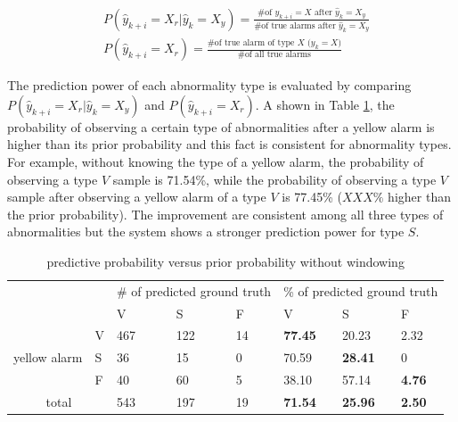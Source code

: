 \begin{align}
\nonumber 
&P(\hat{y}_{k+i}=X_r|\hat{y}_{k}=X_y)=\frac{\text{\# of $y_{k+i}=X$ after $\hat{y}_k=X_y$}}{\text{\# of true alarms after $\hat{y}_k=X_y$}} \\
&P(\hat{y}_{k+i}=X_r)=\frac{\text{\# of true alarm of type $X$ ($y_{k}=X$)}}{\text{\# of all true alarms}} 
\end{align}

The prediction power of each abnormality type is evaluated by comparing $P(\hat{y}_{k+i}=X_r|\hat{y}_{k}=X_y)$ and $P(\hat{y}_{k+i}=X_r)$. A shown in Table \ref{table:pred}, the probability of observing a certain type of abnormalities after a yellow alarm is higher than its prior probability and this fact is consistent for abnormality types. For example, without knowing the type of a yellow alarm, the probability of observing a type $V$ sample is 71.54\%, while the probability of observing a type $V$ sample after observing a yellow alarm of a type $V$ is 77.45\% ($XXX\%$ higher than the prior probability). The improvement are consistent among all three types of abnormalities but the system shows a stronger prediction power for type $S$. 

\begin{table}[t]
\centering
\caption{predictive probability versus prior probability without windowing}
\label{table:pred}
\begin{tabular}{|c|l|l|l|l||l|l|l|}
\hline
\multicolumn{2}{|l|}{\multirow{2}{*}{}} & \multicolumn{3}{l|}{\# of predicted ground truth} & \multicolumn{3}{l|}{\% of predicted ground truth} \\ \cline{3-8} 
\multicolumn{2}{|l|}{}                  & V               & S               & F             & V               & S               & F             \\ \hline
\multirow{3}{*}{yellow alarm}    & V    & 467             & 122              & 14            & \textbf{77.45}  & 20.23           & 2.32          \\ \cline{2-8} 
                                 & S    & 36              & 15              & 0             & 70.59           & \textbf{28.41}  & 0             \\ \cline{2-8} 
                                 & F    & 40              & 60              & 5             & 38.10           & 57.14           & \textbf{4.76} \\ \hline
\multicolumn{2}{|c|}{total}             & 543             & 197             & 19            & \textbf{71.54}  & \textbf{25.96}  & \textbf{2.50} \\ \hline
\end{tabular}
\end{table}


